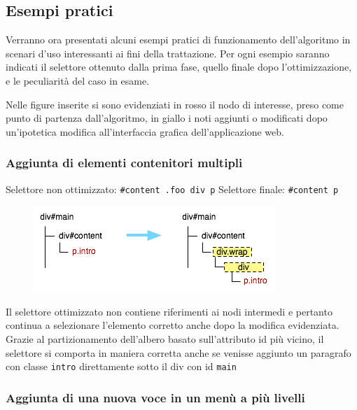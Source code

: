 \documentclass[12pt]{toptesi}
\begin{document}
\subsection {Esempi pratici}

Verranno ora presentati alcuni esempi pratici di funzionamento dell'algoritmo in scenari d'uso interessanti ai fini della trattazione. Per ogni esempio saranno indicati il selettore ottenuto dalla prima fase, quello finale dopo l'ottimizzazione, e le peculiarità del caso in esame.

Nelle figure inserite si sono evidenziati in rosso il nodo di interesse, preso come punto di partenza dall'algoritmo, in giallo i noti aggiunti o modificati dopo un'ipotetica modifica all'interfaccia grafica dell'applicazione web.

\subsubsection {Aggiunta di elementi contenitori multipli}

Selettore non ottimizzato:  \verb|#content .foo div p| 
\newline
Selettore finale:  \verb|#content p| 

\begin{figure}[htbp]
\begin{center}
\includegraphics{images/dom_examples/wrap.png}
\end{center}
\end{figure}

Il selettore ottimizzato non contiene riferimenti ai nodi intermedi e pertanto continua a selezionare l'elemento corretto anche dopo la modifica evidenziata. Grazie al partizionamento dell'albero basato sull'attributo id più vicino, il selettore si comporta in maniera corretta anche se venisse aggiunto un paragrafo con classe \verb|intro| direttamente sotto il div con id \verb|main|

\subsubsection {Aggiunta di una nuova voce in un menù a più livelli}
\end{document}
